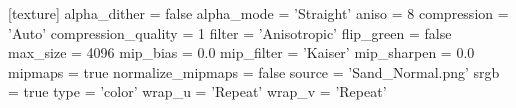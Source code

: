 [texture]
alpha_dither = false
alpha_mode = 'Straight'
aniso = 8
compression = 'Auto'
compression_quality = 1
filter = 'Anisotropic'
flip_green = false
max_size = 4096
mip_bias = 0.0
mip_filter = 'Kaiser'
mip_sharpen = 0.0
mipmaps = true
normalize_mipmaps = false
source = 'Sand_Normal.png'
srgb = true
type = 'color'
wrap_u = 'Repeat'
wrap_v = 'Repeat'